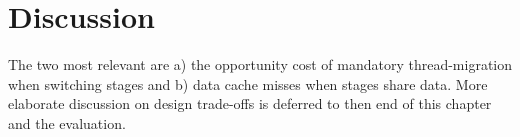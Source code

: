\documentclass[12pt,a4paper]{book}
\begin{document}
%


%
\blindtext

\section{Discussion}\label{ch:di:discuss}
The two most relevant are a) the opportunity cost of mandatory thread-migration when switching stages and b) data cache misses when stages share data.
More elaborate discussion on design trade-offs is deferred to then end of this chapter and the evaluation.

\end{document}
